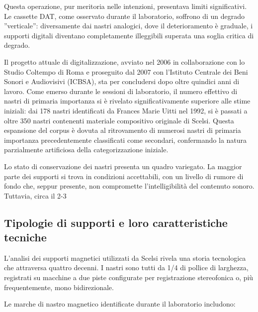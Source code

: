Questa operazione, pur meritoria nelle intenzioni, presentava limiti significativi. Le cassette DAT, come osservato durante il laboratorio, soffrono di un degrado ''verticale'': diversamente dai nastri analogici, dove il deterioramento è graduale, i supporti digitali diventano completamente illeggibili superata una soglia critica di degrado.

Il progetto attuale di digitalizzazione, avviato nel 2006 in collaborazione con lo Studio Coltempo di Roma e proseguito dal 2007 con l'Istituto Centrale dei Beni Sonori e Audiovisivi (ICBSA)\cite{Bernardini2012themul}, sta per concludersi dopo oltre quindici anni di lavoro. Come emerso durante le sessioni di laboratorio, il numero effettivo di nastri di primaria importanza si è rivelato significativamente superiore alle stime iniziali: dai 178 nastri identificati da Frances Marie Uitti nel 1992, si è passati a oltre 350 nastri contenenti materiale compositivo originale di Scelsi. Questa espansione del corpus è dovuta al ritrovamento di numerosi nastri di primaria importanza precedentemente classificati come secondari, confermando la natura parzialmente artificiosa della categorizzazione iniziale.

Lo stato di conservazione dei nastri presenta un quadro variegato. La maggior parte dei supporti si trova in condizioni accettabili, con un livello di rumore di fondo che, seppur presente, non compromette l'intelligibilità del contenuto sonoro. Tuttavia, circa il 2-3%
\subsection{Tipologie di supporti e loro caratteristiche tecniche}
L'analisi dei supporti magnetici utilizzati da Scelsi rivela una storia tecnologica che attraversa quattro decenni. I nastri sono tutti da 1/4 di pollice di larghezza, registrati su macchine a due piste configurate per registrazione stereofonica o, più frequentemente, mono bidirezionale.

Le marche di nastro magnetico identificate durante il laboratorio includono:

